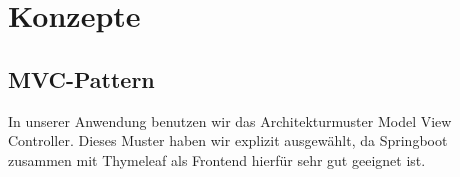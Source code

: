 \section{Konzepte}

\subsection{MVC-Pattern}
In unserer Anwendung benutzen wir das Architekturmuster Model View Controller.
Dieses Muster haben wir explizit ausgewählt, da Springboot zusammen mit Thymeleaf als Frontend hierfür sehr gut geeignet ist.

